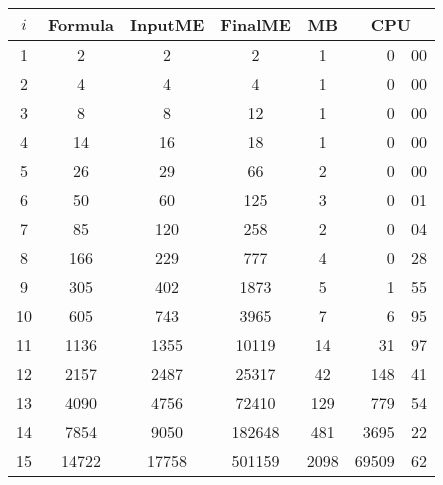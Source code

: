 \begin{tabular}{|c|c|c|c|c|r@{.}l|} \hline
$i$ & Formula & InputME & FinalME & MB & \multicolumn{2}{c|}{CPU}\\
\hline 
1 & 2 & 2 & 2 & 1 & 0&00\\
2 & 4 & 4 & 4 & 1 & 0&00\\
3 & 8 & 8 & 12 & 1 & 0&00\\
4 & 14 & 16 & 18 & 1 & 0&00\\
5 & 26 & 29 & 66 & 2 & 0&00\\
6 & 50 & 60 & 125 & 3 & 0&01\\
7 & 85 & 120 & 258 & 2 & 0&04\\
8 & 166 & 229 & 777 & 4 & 0&28\\
9 & 305 & 402 & 1873 & 5 & 1&55\\
10 & 605 & 743 & 3965 & 7 & 6&95\\
11 & 1136 & 1355 & 10119 & 14 & 31&97\\
12 & 2157 & 2487 & 25317 & 42 & 148&41\\
13 & 4090 & 4756 & 72410 & 129 & 779&54\\
14 & 7854 & 9050 & 182648 & 481 & 3695&22\\
15 & 14722 & 17758 & 501159 & 2098 & 69509&62\\
\hline
\end{tabular}
